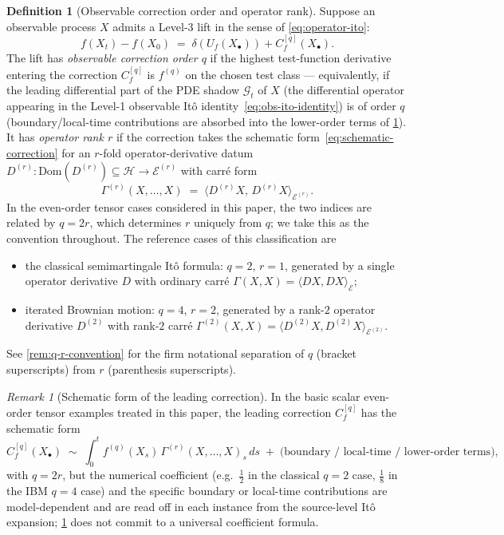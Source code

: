 \documentclass[11pt,reqno]{amsart}
\theoremstyle{plain}
\theoremstyle{definition}
\newtheorem{definition}[theorem]{Definition}
\theoremstyle{remark}
\newtheorem{remark}[theorem]{Remark}
\newcommand{\Hilb}{\mathcal{H}}
\newcommand{\Dom}{\mathrm{Dom}}
\newcommand{\Energy}{\mathcal{E}}
\newcommand{\Carre}{\Gamma}
\begin{document}
\begin{definition}[Observable correction order and operator rank]
\label{def:energy-order}
Suppose an observable process $X$ admits a Level-3 lift in the sense
of \cref{eq:operator-ito}:
\begin{equation}\label{eq:order-q-ito}
  f(X_t)-f(X_0)\;=\;\delta(U_f(X_\bullet))+C_f^{[q]}(X_\bullet).
\end{equation}
The lift has \emph{observable correction order $q$} if the highest
test-function derivative entering the correction $C_f^{[q]}$ is
$f^{(q)}$ on the chosen test class --- equivalently, if the leading
differential part of the PDE shadow $\mathcal G_t$ of $X$ (the
differential operator appearing in the Level-1 observable It\^o
identity~\eqref{eq:obs-ito-identity}) is of order $q$
(boundary/local-time contributions are absorbed into the lower-order
terms of \cref{rem:schematic-correction}).
It has \emph{operator rank $r$} if the correction takes the schematic
form~\eqref{eq:schematic-correction} for an $r$-fold
operator-derivative datum
$D^{(r)}\colon\Dom(D^{(r)})\subseteq\Hilb\to\Energy^{(r)}$ with
carr\'e form
\[
  \Carre^{(r)}(X,\dots,X)
   \;=\;\langle D^{(r)}X,\,D^{(r)}X\rangle_{\Energy^{(r)}}.
\]
In the even-order tensor cases considered in this paper, the two
indices are related by $q=2r$, which determines $r$ uniquely from $q$;
we take this as the convention throughout. The reference cases of
this classification are
\begin{itemize}
\item the classical semimartingale It\^o formula: $q=2$, $r=1$,
  generated by a single operator derivative $D$ with ordinary carr\'e
  $\Carre(X,X)=\langle DX,DX\rangle_\Energy$;
\item iterated Brownian motion: $q=4$, $r=2$, generated by a rank-$2$
  operator derivative $D^{(2)}$ with rank-$2$ carr\'e
  $\Carre^{(2)}(X,X)=\langle D^{(2)}X,D^{(2)}X\rangle_{\Energy^{(2)}}$.
\end{itemize}
See \cref{rem:q-r-convention} for the firm notational separation of
$q$ (bracket superscripts) from $r$ (parenthesis superscripts).
\end{definition}

\begin{remark}[Schematic form of the leading correction]
\label{rem:schematic-correction}
In the basic scalar even-order tensor examples treated in this paper,
the leading correction $C_f^{[q]}$ has the schematic form
\begin{equation}\label{eq:schematic-correction}
  C_f^{[q]}(X_\bullet)
   \;\sim\;\int_0^t f^{(q)}(X_s)\,
        \Carre^{(r)}(X,\dots,X)_{s}\,ds
   \;+\;\text{(boundary / local-time / lower-order terms)},
\end{equation}
with $q=2r$, but the numerical coefficient (e.g.\ $\tfrac12$ in the
classical $q=2$ case, $\tfrac18$ in the IBM $q=4$ case) and the
specific boundary or local-time contributions are model-dependent and
are read off in each instance from the source-level It\^o expansion;
\cref{def:energy-order} does not commit to a universal coefficient
formula.
\end{remark}
\end{document}
